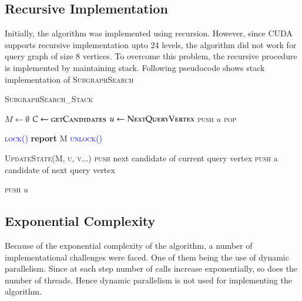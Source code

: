 \subsection{Recursive Implementation}

Initially, the algorithm was implemented using recursion. However, since CUDA supports recursive implementation upto 24 levels, the algorithm did not work for query graph of size 8 vertices. To overcome this problem, the recursive procedure is implemented by maintaining stack. Following pseudocode shows stack implementation of \textsc{SubgraphSearch}


\begin{frame}{}
    \begin{algorithm}
\caption{\textsc{SubgraphSearch\_Stack}}\label{euclid}
\begin{algorithmic}[1]
\State $M \gets \emptyset$
\State $C \gets \textsc{getCandidates}$
\State $u \gets \textsc{NextQueryVertex}$
\State \textsc{push} $u$
    \State \textsc{pop}
    
        \State \textsc{\textcolor{blue}{lock()}}
        \State \textbf{report} M
        \State \textsc{\textcolor{blue}{unlock()}}
        
    \Else
                \State \textsc{UpdateState(M, u, v...)}
                \State \textsc{push} next candidate of current query vertex
                \State \textsc{push} a candidate of next query vertex
            \EndIf
            
        \Else
            \State \textsc{push} $u$
        \EndIf
    \EndIf
\EndWhile

\end{algorithmic}
\end{algorithm}
\end{frame}




\subsection{Exponential Complexity}

Because of the exponential complexity of the algorithm, a number of implementational challenges were faced. One of them being the use of dynamic parallelism. Since at each step number of calls increase exponentially, so does the number of threads. Hence dynamic parallelism is not used for implementing the algorithm.
